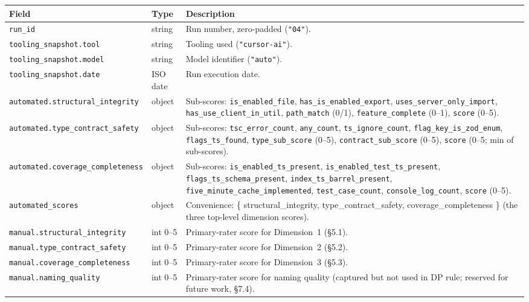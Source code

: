 \begin{table}[H]
\centering
\scriptsize
\setlength{\tabcolsep}{3pt}
\begin{tabular}{lp{4cm}p{7cm}}
\toprule
\textbf{Field} & \textbf{Type} & \textbf{Description} \\
\midrule
\texttt{run\_id} & string & Run number, zero-padded (\texttt{"04"}). \\
\texttt{tooling\_snapshot.tool} & string & Tooling used (\texttt{"cursor-ai"}). \\
\texttt{tooling\_snapshot.model} & string & Model identifier (\texttt{"auto"}). \\
\texttt{tooling\_snapshot.date} & ISO date & Run execution date. \\
\texttt{automated.structural\_integrity} & object & Sub-scores: \texttt{is\_enabled\_file}, \texttt{has\_is\_enabled\_export}, \texttt{uses\_server\_only\_import}, \texttt{has\_use\_client\_in\_util}, \texttt{path\_match} (0/1), \texttt{feature\_complete} (0--1), \texttt{score} (0--5). \\
\texttt{automated.type\_contract\_safety} & object & Sub-scores: \texttt{tsc\_error\_count}, \texttt{any\_count}, \texttt{ts\_ignore\_count}, \texttt{flag\_key\_is\_zod\_enum}, \texttt{flags\_ts\_found}, \texttt{type\_sub\_score} (0--5), \texttt{contract\_sub\_score} (0--5), \texttt{score} (0--5; min of sub-scores). \\
\texttt{automated.coverage\_completeness} & object & Sub-scores: \texttt{is\_enabled\_ts\_present}, \texttt{is\_enabled\_test\_ts\_present}, \texttt{flags\_ts\_schema\_present}, \texttt{index\_ts\_barrel\_present}, \texttt{five\_minute\_cache\_implemented}, \texttt{test\_case\_count}, \texttt{console\_log\_count}, \texttt{score} (0--5). \\
\texttt{automated\_scores} & object & Convenience: \{ structural\_integrity, type\_contract\_safety, coverage\_completeness \} (the three top-level dimension scores). \\
\texttt{manual.structural\_integrity} & int 0--5 & Primary-rater score for Dimension~1 (\S5.1). \\
\texttt{manual.type\_contract\_safety} & int 0--5 & Primary-rater score for Dimension~2 (\S5.2). \\
\texttt{manual.coverage\_completeness} & int 0--5 & Primary-rater score for Dimension~3 (\S5.3). \\
\texttt{manual.naming\_quality} & int 0--5 & Primary-rater score for naming quality (captured but not used in DP rule; reserved for future work, \S7.4). \\

\end{tabular}
\end{table}
